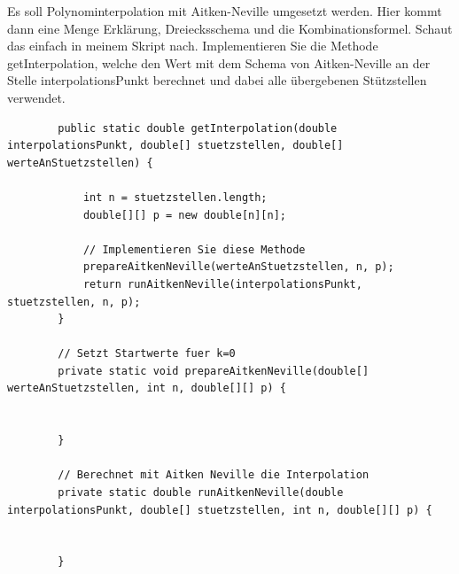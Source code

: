 \documentclass{scrartcl}
\begin{document}
%	
%	



	Es soll Polynominterpolation mit Aitken-Neville umgesetzt werden.
	\n 
	Hier kommt dann eine Menge Erklärung, Dreiecksschema und die Kombinationsformel. Schaut das einfach in meinem Skript nach.
	\n 
	Implementieren Sie die Methode getInterpolation, welche den Wert mit dem Schema von Aitken-Neville an der Stelle interpolationsPunkt berechnet und dabei alle übergebenen Stützstellen verwendet.
	
	\begin{lstlisting}
		public static double getInterpolation(double interpolationsPunkt, double[] stuetzstellen, double[] werteAnStuetzstellen) {
		
			int n = stuetzstellen.length;
			double[][] p = new double[n][n];
			
			// Implementieren Sie diese Methode
			prepareAitkenNeville(werteAnStuetzstellen, n, p);
			return runAitkenNeville(interpolationsPunkt, stuetzstellen, n, p);
		}
		
		// Setzt Startwerte fuer k=0
		private static void prepareAitkenNeville(double[] werteAnStuetzstellen, int n, double[][] p) {
		
		
		}
		
		// Berechnet mit Aitken Neville die Interpolation
		private static double runAitkenNeville(double interpolationsPunkt, double[] stuetzstellen, int n, double[][] p) {
		
		
		}
	\end{lstlisting}
\end{document}
